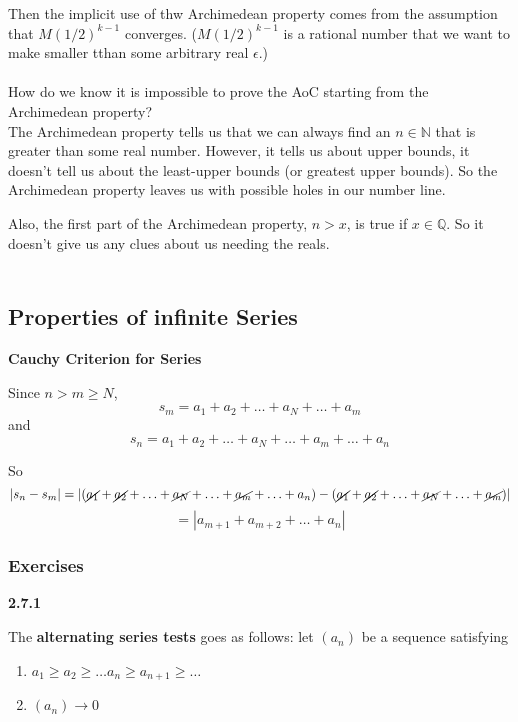 Then the implicit use of thw Archimedean property comes from the assumption that $M(1/2)^{k-1}$
converges.
($M(1/2)^{k-1}$ is a rational number that we want to make smaller tthan some arbitrary real $\epsilon$.)
\\~\\

How do we know it is impossible to prove the AoC starting from the Archimedean property?
\\

The Archimedean property tells us that we can always find an $n\in\mathbb{N}$
that is greater than some real number.
However, it tells us about upper bounds, it doesn't tell us about the least-upper bounds
(or greatest upper bounds).
So the Archimedean property leaves us with possible holes in our number line.

Also, the first part of the Archimedean property, $n>x$, is true if $x\in\mathbb{Q}$.
So it doesn't give us any clues about us needing the reals.
\\~\\



\subsection{Properties of infinite Series}

\textbf{Cauchy Criterion for Series}

Since $n > m \geq N$,
$$
s_m = a_1 + a_2 + \ldots + a_N + \ldots + a_m
$$
and
$$
s_n = a_1 + a_2 + \ldots + a_N + \ldots + a_m + \ldots + a_n
$$

So
$$
|s_n - s_m| = 
\left| (\cancel{a_1} + \cancel{a_2} + \ldots + \cancel{a_N} + \ldots + \cancel{a_m} + \ldots + a_n) - 
(\cancel{a_1} + \cancel{a_2} + \ldots + \cancel{a_N} + \ldots + \cancel{a_m})\right|
$$
$$
= \left| a_{m+1} + a_{m+2} + \ldots + a_n \right|
$$



\subsubsection{Exercises}


\textbf{2.7.1}

The \textbf{alternating series tests} goes as follows:
let $(a_n)$ be a sequence satisfying
\begin{enumerate}
    \item $a_1 \geq a_2 \geq \ldots a_n \geq a_{n+1} \geq \ldots$
    \item $(a_n) \rightarrow 0$
\end{enumerate}

